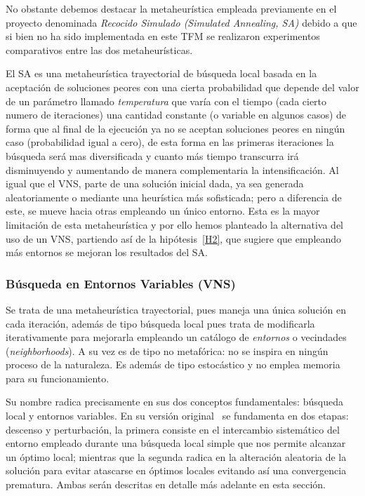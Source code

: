 No obstante debemos destacar la metaheurística empleada previamente en el proyecto \legacy{} denominada \textit{Recocido Simulado (Simulated Annealing, SA)} debido a que si bien no ha sido implementada en este TFM se realizaron experimentos comparativos entre las dos metaheurísticas. 

El SA  es una metaheurística trayectorial de búsqueda local basada en la aceptación de soluciones peores con una cierta probabilidad que depende del valor de un parámetro llamado \textit{temperatura} que varía con el tiempo (cada cierto numero de iteraciones) una cantidad constante (o variable en algunos casos) de forma que al final de la ejecución ya no se aceptan soluciones peores en ningún caso (probabilidad igual a cero), de esta forma en las primeras iteraciones la búsqueda será mas diversificada y cuanto más tiempo transcurra irá disminuyendo y aumentando de manera complementaria la intensificación. Al igual que el VNS, parte de una solución inicial dada, ya sea generada aleatoriamente o mediante una heurística más sofisticada; pero a diferencia de este, se mueve hacia otras empleando un único entorno. Esta es la mayor limitación de esta metaheurística y por ello hemos planteado la alternativa del uso de un VNS, partiendo así de la hipótesis~\ref{H2}, que sugiere que empleando más entornos se mejoran los resultados del SA.

\subsubsection{Búsqueda en Entornos Variables (VNS)}
Se trata de una metaheurística trayectorial, pues maneja una única solución en cada iteración, además de tipo búsqueda local pues trata de modificarla iterativamente para mejorarla empleando un catálogo de \textit{entornos} o vecindades (\textit{neighborhoods}). A su vez es de tipo no metafórica: no se inspira en ningún proceso de la naturaleza. Es además de tipo estocástico y no emplea memoria para su funcionamiento.

Su nombre radica precisamente en sus dos conceptos fundamentales: búsqueda local y entornos variables. En su versión original~\cite{vns} se fundamenta en dos etapas: descenso y perturbación, la primera consiste en el intercambio sistemático del entorno empleado durante una búsqueda local simple que nos permite alcanzar un óptimo local; mientras que la segunda radica en la alteración aleatoria de la solución para evitar atascarse en óptimos locales evitando así una convergencia prematura. Ambas serán descritas en detalle más adelante en esta sección.

